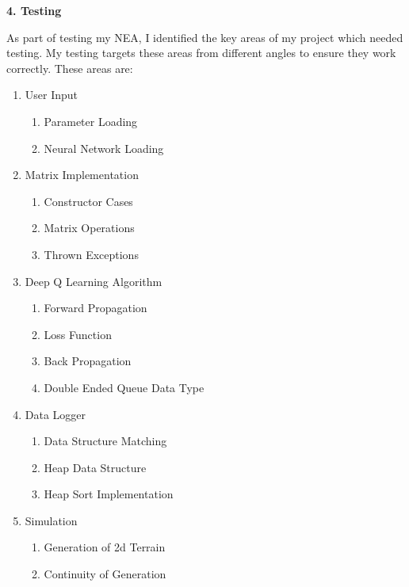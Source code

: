 \begin{flushleft}
    \huge
    \textbf{4. Testing}
    \vspace{0.1cm}
    
    \large
    As part of testing my NEA, I identified the key areas of my project which needed testing.
    My testing targets these areas from different angles to ensure they work correctly. 
    These areas are:
    \begin{enumerate}
        \item User Input
            \begin{enumerate}
                \item Parameter Loading
                \item Neural Network Loading
            \end{enumerate}
        \item Matrix Implementation
            \begin{enumerate}
                \item Constructor Cases
                \item Matrix Operations
                \item Thrown Exceptions
            \end{enumerate}
        \item Deep Q Learning Algorithm
            \begin{enumerate}
                \item Forward Propagation
                \item Loss Function
                \item Back Propagation
                \item Double Ended Queue Data Type
            \end{enumerate}
        \item Data Logger
            \begin{enumerate}
                \item Data Structure Matching
                \item Heap Data Structure
                \item Heap Sort Implementation
            \end{enumerate}
        \item Simulation
            \begin{enumerate}
                \item Generation of 2d Terrain
                \item Continuity of Generation
            \end{enumerate}
    \end{enumerate}
    

\end{flushleft}
